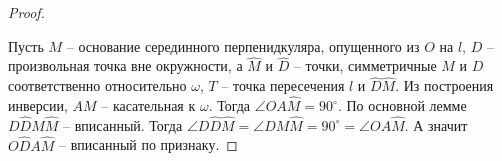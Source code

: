 \documentclass[12pt]{article}
\theoremstyle{definition}
\begin{document}
\begin{proof}
\begin{center}
        \end{center}
        Пусть $M$ -- основание серединного перпенидкуляра, опущенного из $O$ на $l$, $D$ -- произвольная точка вне окружности, а $\widehat{M}$ и $\widehat{D}$ -- точки, симметричные $M$ и $D$ соответственно относительно $\omega$, $T$ -- точка пересечения $l$ и $\widehat{D}\widehat{M}$. Из построения инверсии, $AM$ -- касательная к $\omega$. Тогда $\angle OA\widehat{M}=90^{\circ}$. По основной лемме $D\widehat{D}M\widehat{M}$ -- вписанный. Тогда $\angle D\widehat{D}\widehat{M}=\angle DM\widehat{M}=90^{\circ}=\angle OA\widehat{M}$. А значит $O\widehat{D}A\widehat{M}$ -- вписанный по признаку.
    \end{proof}
\end{document}
